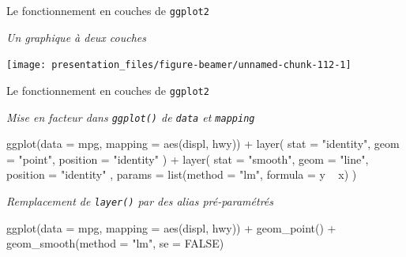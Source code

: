 \documentclass[12pt,handout,ignorenonframetext,]{beamer}
\newenvironment{Shaded}{}{}
\newcommand{\KeywordTok}[1]{\textcolor[rgb]{0.00,0.00,1.00}{#1}}
\newcommand{\DataTypeTok}[1]{#1}
\newcommand{\StringTok}[1]{\textcolor[rgb]{0.00,0.50,0.50}{#1}}
\newcommand{\OtherTok}[1]{\textcolor[rgb]{1.00,0.25,0.00}{#1}}
\newcommand{\OperatorTok}[1]{#1}
\newcommand{\NormalTok}[1]{#1}
\renewenvironment{Shaded}{\begin{snugshade}}{\end{snugshade}}
\begin{document}
\begin{frame}{\large Le fonctionnement en \og couches \fg{} de
\texttt{ggplot2}}

\emph{Un graphique à deux couches}

\centering

\texttt{[image: presentation\_files/figure-beamer/unnamed-chunk-112-1]}

\end{frame}

\begin{frame}[fragile]{\large Le fonctionnement en \og couches \fg{} de
\texttt{ggplot2}}

\emph{Mise en facteur dans \texttt{ggplot()} de \texttt{data} et
\texttt{mapping}}

\footnotesize \vspace{-1mm}

\begin{Shaded}
\begin{Highlighting}[]
\KeywordTok{ggplot}\NormalTok{(}\DataTypeTok{data =}\NormalTok{ mpg, }\DataTypeTok{mapping =} \KeywordTok{aes}\NormalTok{(displ, hwy)) }\OperatorTok{+}\StringTok{ }\KeywordTok{layer}\NormalTok{(}
  \DataTypeTok{stat =} \StringTok{"identity"}\NormalTok{, }\DataTypeTok{geom =} \StringTok{"point"}\NormalTok{, }\DataTypeTok{position =} \StringTok{"identity"}
\NormalTok{) }\OperatorTok{+}\StringTok{ }\KeywordTok{layer}\NormalTok{(}
  \DataTypeTok{stat =} \StringTok{"smooth"}\NormalTok{, }\DataTypeTok{geom =} \StringTok{"line"}\NormalTok{, }\DataTypeTok{position =} \StringTok{"identity"}
\NormalTok{  , }\DataTypeTok{params =} \KeywordTok{list}\NormalTok{(}\DataTypeTok{method =} \StringTok{"lm"}\NormalTok{, }\DataTypeTok{formula =}\NormalTok{ y }\OperatorTok{~}\StringTok{ }\NormalTok{x)}
\NormalTok{)}
\end{Highlighting}
\end{Shaded}

\normalsize \vspace{-3mm}

\emph{Remplacement de \texttt{layer()} par des alias pré-paramétrés}

\footnotesize \vspace{-1mm}

\begin{Shaded}
\begin{Highlighting}[]
\KeywordTok{ggplot}\NormalTok{(}\DataTypeTok{data =}\NormalTok{ mpg, }\DataTypeTok{mapping =} \KeywordTok{aes}\NormalTok{(displ, hwy)) }\OperatorTok{+}\StringTok{ }
\StringTok{  }\KeywordTok{geom_point}\NormalTok{() }\OperatorTok{+}\StringTok{ }\KeywordTok{geom_smooth}\NormalTok{(}\DataTypeTok{method =} \StringTok{"lm"}\NormalTok{, }\DataTypeTok{se =} \OtherTok{FALSE}\NormalTok{)}
\end{Highlighting}
\end{Shaded}


\end{frame}
\end{document}

